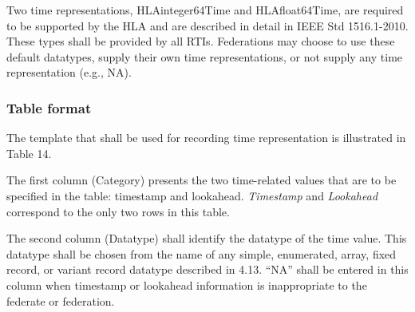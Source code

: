 Two time representations, HLAinteger64Time and HLAfloat64Time, are required to be supported by the HLA and are described in detail in IEEE Std 1516.1-2010. These types shall be provided by all RTIs. Federations may choose to use these default datatypes, supply their own time representations, or not supply any time representation (e.g., NA).

\vspace{-14pt}

\subsubsection{Table format}
The template that shall be used for recording time representation is illustrated in Table 14.

\vspace{-8.8pt}
\begingroup
\fontsize{9}{10.9}\selectfont
\setlength{\tabcolsep}{4pt}
\renewcommand{\arraystretch}{1.34}
\noindent{}
\endgroup\vspace{6.7pt}

The first column (Category) presents the two time-related values that are to be specified in the table: timestamp and lookahead. \textit{Timestamp} and \textit{Lookahead} correspond to the only two rows in this table.

The second column (Datatype) shall identify the datatype of the time value. This datatype shall be chosen from the name of any simple, enumerated, array, fixed record, or variant record datatype described in 4.13. ``NA'' shall be entered in this column when timestamp or lookahead information is inappropriate to the federate or federation.

